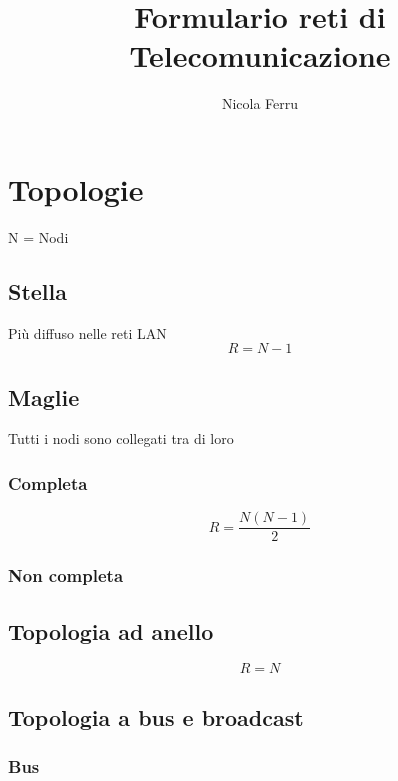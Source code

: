 \documentclass{report}
\title{Formulario reti di Telecomunicazione}
\author{Nicola Ferru}
\begin{document}
\maketitle

\chapter{Topologie}
\label{chap:topologie}
N = Nodi 
\section{Stella}
\label{sec:stella}
Più diffuso nelle reti LAN
\begin{equation}
  \label{eq:stella}
  R=N-1
\end{equation}

\section{Maglie}
\label{sec:maglie}
Tutti i nodi sono collegati tra di loro
\subsection{Completa}
\label{sec:maglie-comp}
\begin{equation}
  \label{eq:maglie-comp}
  R=\frac{N(N-1)}{2}
\end{equation}

\subsection{Non completa}
\label{sec:noncompleta}


\section{Topologia ad anello}
\label{sec:topologiaanello}

\begin{equation}
  \label{eq:anello}
  R=N
\end{equation}

\section{Topologia a bus e broadcast}
\label{sec:topbusebrod}

\subsection{Bus}
\label{sec:bus}
\end{document}
